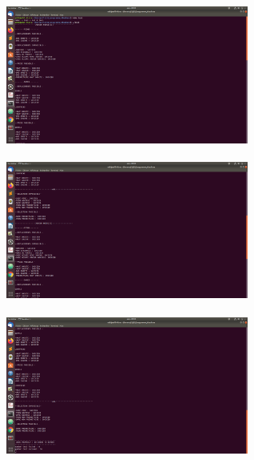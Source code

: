 \documentclass[a4paper]{article}
\begin{document}
\includegraphics[width = 8cm, height = 5cm]{TestReussi1.png}
\includegraphics[width = 8cm, height = 5cm]{TestReussi2.png}
\bigbreak
\includegraphics[width = 8cm, height = 5cm]{TestReussi3.png}
\end{document}

